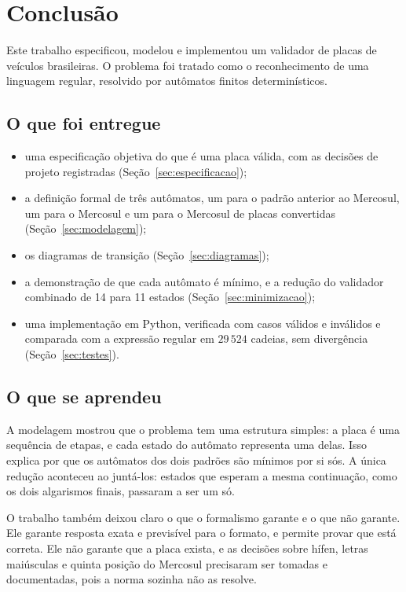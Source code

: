 \section{Conclusão}
\label{sec:conclusao}

Este trabalho especificou, modelou e implementou um validador de
placas de veículos brasileiras. O problema foi tratado como o
reconhecimento de uma linguagem regular, resolvido por autômatos
finitos determinísticos.

\subsection{O que foi entregue}

\begin{itemize}
  \item uma especificação objetiva do que é uma placa válida, com
        as decisões de projeto registradas (Seção~\ref{sec:especificacao});
  \item a definição formal de três autômatos, um para o padrão
        anterior ao Mercosul, um para o Mercosul e um para o
        Mercosul de placas convertidas (Seção~\ref{sec:modelagem});
  \item os diagramas de transição (Seção~\ref{sec:diagramas});
  \item a demonstração de que cada autômato é mínimo, e a redução
        do validador combinado de 14 para 11 estados (Seção~\ref{sec:minimizacao});
  \item uma implementação em Python, verificada com casos válidos e
        inválidos e comparada com a expressão regular em
        $29\,524$ cadeias, sem divergência (Seção~\ref{sec:testes}).
\end{itemize}

\subsection{O que se aprendeu}

A modelagem mostrou que o problema tem uma estrutura simples: a
placa é uma sequência de etapas, e cada estado do autômato
representa uma delas. Isso explica por que os autômatos dos dois
padrões são mínimos por si sós. A única redução aconteceu ao
juntá-los: estados que esperam a mesma continuação, como os dois
algarismos finais, passaram a ser um só.

O trabalho também deixou claro o que o formalismo garante e o que
não garante. Ele garante resposta exata e previsível para o
formato, e permite provar que está correta. Ele não garante que a
placa exista, e as decisões sobre hífen, letras maiúsculas e
quinta posição do Mercosul precisaram ser tomadas e documentadas,
pois a norma sozinha não as resolve.


